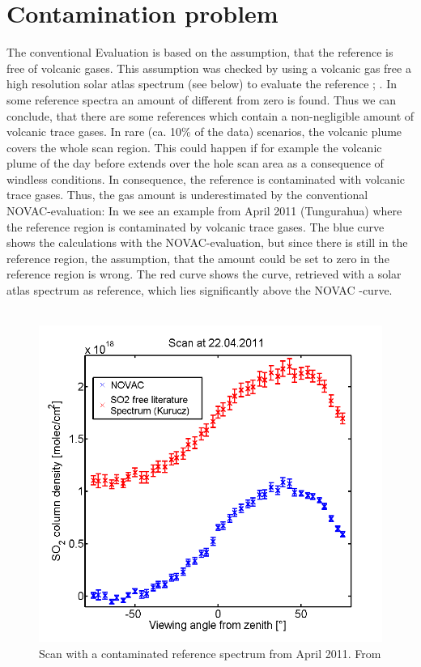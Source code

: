 \section{Contamination problem\label{Chap:Cont}}

The conventional Evaluation is based on the assumption, that the reference is free of volcanic gases. This assumption was checked by using a volcanic gas free a high resolution solar atlas spectrum (see below) to evaluate the reference \cite{lubcke2014optical}; \cite{salerno2009novel}. In some reference spectra an amount of   different from zero is found. Thus we can conclude, that there are some references which contain a non-negligible amount of volcanic trace gases.
In rare (ca. 10\% of the data) scenarios, the
volcanic plume covers the whole scan region.
This could happen if for example the volcanic plume of the day before extends over the hole scan area as a consequence of windless conditions.
In consequence, the reference	is contaminated with volcanic trace gases. Thus, the gas amount is underestimated by the conventional NOVAC-evaluation: In  we see an example from April 2011 (Tungurahua) where the reference region is contaminated by volcanic trace gases. The blue  curve shows the calculations with the NOVAC-evaluation, but since there is still  in the reference region, the assumption, that the  amount could be set to zero in the reference region is wrong. The red curve shows the  curve, retrieved with a solar atlas spectrum as reference, which lies significantly above the NOVAC -curve.\\
\\	
%
\begin{figure}
	\centering
	\includegraphics[width=0.7\linewidth]{Bilder/contaminated}
	\caption{Scan with a contaminated reference spectrum from April 2011. From \cite{WarnachSimon}}
	\label{fig:contaminated}
\end{figure}
\\


